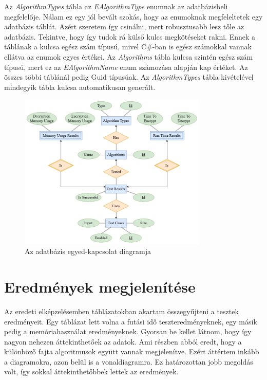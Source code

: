 \documentclass[12pt]{report} %
\begin{document}
Az \textit{AlgorithmTypes} tábla az \textit{EAlgorithmType} enumnak az adatbázisbeli megfelelője. Nálam ez egy jól bevált szokás, hogy az enumoknak megfeleltetek egy adatbázis táblát. Azért szeretem így csinálni, mert robusztusabb lesz tőle az adatbázis.
Tekintve, hogy így tudok rá külső kulcs megkötéseket rakni. Ennek a táblának a kulcsa egész szám típusú, mivel C\#-ban is egész számokkal vannak ellátva az enumok egyes értékei. Az \textit{Algorithms} tábla kulcsa szintén egész szám típusú, mert ez az \textit{EAlgorithmName} enum számozása alapján kap értéket. Az összes többi táblánál pedig Guid típusúak. Az \textit{AlgorithmTypes} tábla kivételével mindegyik tábla kulcsa automatikusan generált.

\begin{figure}[H]
    \centering %
    \includegraphics[width=0.8\textwidth]{Figures/EntityRelationship.png} %
    \caption{Az adatbázis egyed-kapcsolat diagramja} %
    \label{fig:EntityRelationship} %
\end{figure}

\section{Eredmények megjelenítése} %

Az eredeti elképzelésemben táblázatokban akartam összegyűjteni a tesztek eredményeit. Egy táblázat lett volna a futási idő teszteredményeknek, egy másik pedig a memóriahasználat eredményeknek. Gyorsan be kellet látnom, hogy így nagyon nehezen áttekinthetőek az adatok. Ami részben abból eredt, hogy a különböző fajta algoritmusok együtt vannak megjelenítve. Ezért áttértem inkább a diagramokra, azon belül is a vonaldiagramra. Ez határozottan jobb megoldás volt, így sokkal áttekinthetőbbek lettek az eredmények.
\end{document}
